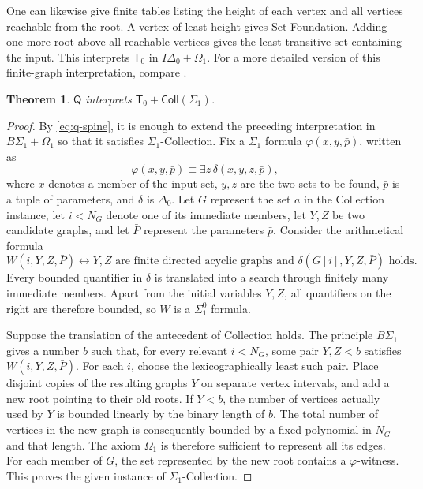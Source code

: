 \documentclass[11pt,a4paper]{article}
\newcommand{\Q}{\mathsf Q}
\newcommand{\IDelta}{I\Delta_{0}}
\newcommand{\BS}[1]{B\Sigma_{#1}}
\newcommand{\OmegaOne}{\Omega_{1}}
\newcommand{\Tzero}{\mathsf T_{0}}
\newcommand{\Coll}[1]{\mathsf{Coll}(#1)}
\theoremstyle{plain}
\newtheorem{theorem}{Theorem}[section]
\theoremstyle{definition}
\theoremstyle{remark}
\begin{document}
One can likewise give finite tables listing the height of each vertex and all vertices reachable from the root. A vertex of least height gives Set Foundation. Adding one more root above all reachable vertices gives the least transitive set containing the input. This interprets \(\Tzero\) in \(\IDelta+\OmegaOne\). For a more detailed version of this finite-graph interpretation, compare \citet{Chen2026}.

\begin{theorem}
  \(\Q\) interprets \(\Tzero+\Coll{\Sigma_1}\).
\end{theorem}
\begin{proof}
  By \eqref{eq:q-spine}, it is enough to extend the preceding interpretation in \(\BS1+\OmegaOne\) so that it satisfies \(\Sigma_1\)-Collection. Fix a \(\Sigma_1\) formula \(\varphi(x,y,\bar p)\), written as
  \[
    \varphi(x,y,\bar p)\equiv\exists z\,\delta(x,y,z,\bar p),
  \]
  where \(x\) denotes a member of the input set, \(y,z\) are the two sets to be found, \(\bar p\) is a tuple of parameters, and \(\delta\) is \(\Delta_0\). Let \(G\) represent the set \(a\) in the Collection instance, let \(i<N_G\) denote one of its immediate members, let \(Y,Z\) be two candidate graphs, and let \(\bar P\) represent the parameters \(\bar p\). Consider the arithmetical formula
  \[
  W(i,Y,Z,\bar P)\longleftrightarrow
  Y,Z\text{ are finite directed acyclic graphs and }
  \delta(G[i],Y,Z,\bar P)\text{ holds}.
  \]
  Every bounded quantifier in \(\delta\) is translated into a search through finitely many immediate members. Apart from the initial variables \(Y,Z\), all quantifiers on the right are therefore bounded, so \(W\) is a \(\Sigma_1^0\) formula.

  Suppose the translation of the antecedent of Collection holds. The principle \(B\Sigma_1\) gives a number \(b\) such that, for every relevant \(i<N_G\), some pair \(Y,Z<b\) satisfies \(W(i,Y,Z,\bar P)\). For each \(i\), choose the lexicographically least such pair. Place disjoint copies of the resulting graphs \(Y\) on separate vertex intervals, and add a new root pointing to their old roots. If \(Y<b\), the number of vertices actually used by \(Y\) is bounded linearly by the binary length of \(b\). The total number of vertices in the new graph is consequently bounded by a fixed polynomial in \(N_G\) and that length. The axiom \(\Omega_1\) is therefore sufficient to represent all its edges. For each member of \(G\), the set represented by the new root contains a \(\varphi\)-witness. This proves the given instance of \(\Sigma_1\)-Collection.
\end{proof}
\end{document}
